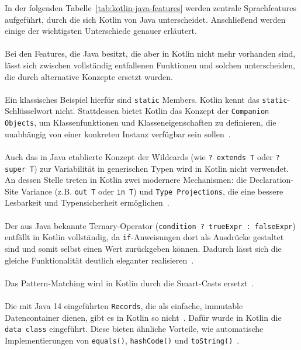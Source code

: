 \documentclass[11pt]{article}
\begin{document}
    In der folgenden Tabelle~\ref{tab:kotlin-java-features} werden zentrale Sprachfeatures aufgeführt, durch die sich Kotlin von Java unterscheidet.
    Anschließend werden einige der wichtigsten Unterschiede genauer erläutert.\\
    \\
    Bei den Features, die Java besitzt, die aber in Kotlin nicht mehr vorhanden sind, lässt sich zwischen vollständig entfallenen Funktionen und solchen unterscheiden, die durch alternative Konzepte ersetzt wurden.\\
    \\
    Ein klassisches Beispiel hierfür sind \texttt{static} Members.
    Kotlin kennt das \texttt{static}-Schlüsselwort nicht.
    Stattdessen bietet Kotlin das Konzept der \texttt{Companion Objects}, um Klassenfunktionen und Klasseneigenschaften zu definieren, die unabhängig von einer konkreten Instanz verfügbar sein sollen~\cite{kotlin-static-members}.\\
    \\
    Auch das in Java etablierte Konzept der Wildcards (wie \texttt{? extends T} oder \texttt{? super T}) zur Variabilität in generischen Typen wird in Kotlin nicht verwendet.
    An dessen Stelle treten in Kotlin zwei modernere Mechanismen: die Declaration-Site Variance (z.B. \texttt{out T} oder \texttt{in T}) und \texttt{Type Projections}, die eine bessere Lesbarkeit und Typensicherheit ermöglichen~\cite{doc-comparison}.\\
    \\
    Der aus Java bekannte Ternary-Operator (\texttt{condition ? trueExpr : falseExpr}) entfällt in Kotlin vollständig, da \texttt{if}-Anweisungen dort als Ausdrücke gestaltet sind und somit selbst einen Wert zurückgeben können.
    Dadurch lässt sich die gleiche Funktionalität deutlich eleganter realisieren~\cite{doc-comparison}.\\
    \\
    Das Pattern-Matching wird in Kotlin durch die Smart-Casts ersetzt~\cite{doc-comparison}.\\
    \\
    Die mit Java 14 eingeführten \texttt{Records}, die als einfache, immutable Datencontainer dienen, gibt es in Kotlin so nicht~\cite{jdk-record}.
    Dafür wurde in Kotlin die \texttt{data class} eingeführt.
    Diese bieten ähnliche Vorteile, wie automatische Implementierungen von \texttt{equals()}, \texttt{hashCode()} und \texttt{toString()}~\cite{kotlin-data-class}.\\
    \\
\end{document}
